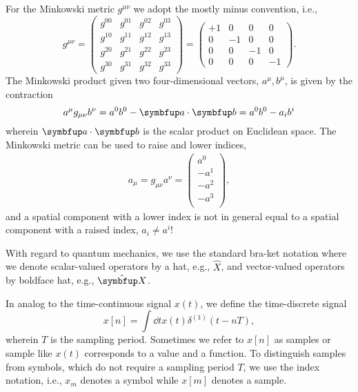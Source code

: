 For the Minkowski metric $g^{\mu\nu}$ we adopt the mostly minus convention, i.e.,
\begin{equation*}
	g^{\mu\nu}
	=
	\begin{pmatrix}
		g^{00} & g^{01} & g^{02} & g^{03} \\
		g^{10} & g^{11} & g^{12} & g^{13} \\
		g^{20} & g^{21} & g^{22} & g^{23} \\
		g^{30} & g^{31} & g^{32} & g^{33}
	\end{pmatrix}
	=
	\begin{pmatrix}
		+1 & 0 & 0 & 0 \\
		0 & -1 & 0 & 0 \\
		0 & 0 & -1 & 0 \\
		0 & 0 & 0 & -1
	\end{pmatrix}
	.
\end{equation*}
The Minkowski product given two four-dimensional vectors, $a^\mu,b^\mu$, is given by the contraction
\begin{equation*}
	a^\mu g_{\mu\nu} b^\nu
	=
	a^0 b^0
	-
	\vb{a}\vdot\vb{b}
	=
	a^0 b^0
	-
	a_i b^i
\end{equation*}
wherein $\vb{a}\vdot\vb{b}$ is the scalar product on Euclidean space.
The Minkowski metric can be used to raise and lower indices,
\begin{align*}
	a_\mu
	=
	g_{\mu\nu}
	a^\nu
	=
	\begin{pmatrix}
		a^0 \\
		-a^1 \\
		-a^2 \\
		-a^3 \\
	\end{pmatrix}
	,
\end{align*}
and a spatial component with a lower index is not in general equal to a spatial component with a raised index, $a_i\neq a^i$!

With regard to quantum mechanics, we use the standard bra-ket notation where we denote scalar-valued operators by a hat, e.g., $\hat{X}$, and vector-valued operators by boldface hat, e.g., $\vu{X}$.

In analog to the time-continuous signal $x(t)$, we define the time-discrete signal
\begin{equation}
	x[n]
	=
	\int\dd{t}
	x(t)
	\delta^{(1)}(t-nT)
	,
\end{equation}
wherein $T$ is the sampling period.
Sometimes we refer to $x[n]$ as samples or sample like $x(t)$ corresponds to a value and a function.
To distinguish samples from symbols, which do not require a sampling period $T$, we use the index notation, i.e., $x_m$ denotes a symbol while $x[m]$ denotes a sample.